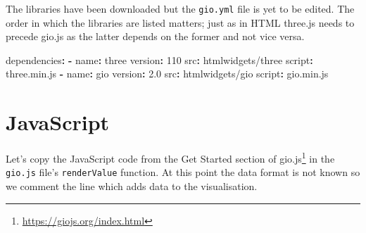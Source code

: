 \documentclass[
]{krantz}
\makeatletter
\newenvironment{Shaded}{\begin{snugshade}}{\end{snugshade}}
\newcommand{\AttributeTok}[1]{\textcolor[rgb]{0.61,0.61,0.61}{#1}}
\newcommand{\DecValTok}[1]{\textcolor[rgb]{0.06,0.06,0.06}{#1}}
\newcommand{\FloatTok}[1]{\textcolor[rgb]{0.06,0.06,0.06}{#1}}
\newcommand{\FunctionTok}[1]{\textcolor[rgb]{0,0,0}{#1}}
\newcommand{\KeywordTok}[1]{\textcolor[rgb]{0.27,0.27,0.27}{\textbf{#1}}}
\renewcommand{\href}[2]{#2\footnote{\url{#1}}}
\newenvironment{kframe}{%
\medskip{}
\setlength{\fboxsep}{.8em}
 \def\at@end@of@kframe{}%
 \ifinner\ifhmode%
  \def\at@end@of@kframe{\end{minipage}}%
  \begin{minipage}{\columnwidth}%
 \fi\fi%
 \def\FrameCommand##1{\hskip\@totalleftmargin \hskip-\fboxsep
 \colorbox{shadecolor}{##1}\hskip-\fboxsep
     \hskip-\linewidth \hskip-\@totalleftmargin \hskip\columnwidth}%
 \MakeFramed {\advance\hsize-\width
   \@totalleftmargin\z@ \linewidth\hsize
   \@setminipage}}%
 {\par\unskip\endMakeFramed%
 \at@end@of@kframe}
\renewenvironment{Shaded}{\begin{kframe}}{\end{kframe}}
\makeatother
\begin{document}
The libraries have been downloaded but the \texttt{gio.yml} file is yet to be edited. The order in which the libraries are listed matters; just as in HTML three.js needs to precede gio.js as the latter depends on the former and not vice versa.

\begin{Shaded}
\begin{Highlighting}[]
\FunctionTok{dependencies}\KeywordTok{:}
\AttributeTok{  }\KeywordTok{{-}}\AttributeTok{ }\FunctionTok{name}\KeywordTok{:}\AttributeTok{ three}
\AttributeTok{    }\FunctionTok{version}\KeywordTok{:}\AttributeTok{ }\DecValTok{110}
\AttributeTok{    }\FunctionTok{src}\KeywordTok{:}\AttributeTok{ htmlwidgets/three}
\AttributeTok{    }\FunctionTok{script}\KeywordTok{:}\AttributeTok{ three.min.js}
\AttributeTok{  }\KeywordTok{{-}}\AttributeTok{ }\FunctionTok{name}\KeywordTok{:}\AttributeTok{ gio}
\AttributeTok{    }\FunctionTok{version}\KeywordTok{:}\AttributeTok{ }\FloatTok{2.0}
\AttributeTok{    }\FunctionTok{src}\KeywordTok{:}\AttributeTok{ htmlwidgets/gio}
\AttributeTok{    }\FunctionTok{script}\KeywordTok{:}\AttributeTok{ gio.min.js}
\end{Highlighting}
\end{Shaded}

\hypertarget{javascript}{%
\section{JavaScript}\label{javascript}}

Let's copy the JavaScript code from the \href{https://giojs.org/index.html}{Get Started section of gio.js} in the \texttt{gio.js} file's \texttt{renderValue} function. At this point the data format is not known so we comment the line which adds data to the visualisation.
\end{document}
